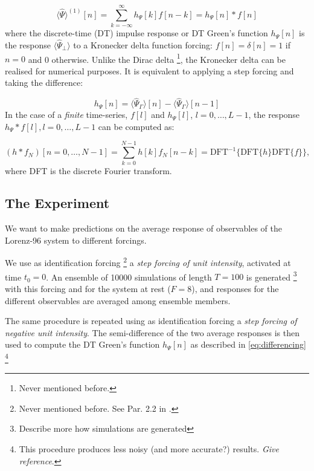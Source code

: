 \documentclass{article}
\begin{document}
\begin{equation}
\langle\hat{\Psi}\rangle^{(1)}[n]=\sum_{k=-\infty}^{\infty} h_{\Psi}[k] f[n-k]=h_{\Psi}[n] * f[n]
\end{equation}
where the discrete-time (DT) impulse response or DT Green's function $h_{\Psi}[n]$ is the response $\langle\hat{\Psi}_{\perp}\rangle$ to a Kronecker delta function forcing: $f[n]=\delta[n]=1$ if $n=0$ and 0 otherwise. Unlike the Dirac delta \footnote{Never mentioned before.\label{fn8}}, the Kronecker delta can be realised for numerical purposes. It is equivalent to applying a step forcing and taking the difference: 

\begin{equation} \label{eq:differencing}
h_{\Psi}[n]=\langle\hat{\Psi}_{\Gamma}\rangle[n]-\langle\hat{\Psi}_{\Gamma}\rangle[n-1]
\end{equation}
In the case of a \textit{finite} time-series, $f[l]$ and $h_{\Psi}[l]$, $l=0, \dots, L-1$, the response $h_{\Psi} * f[l], l=0, \dots, L-1$ can be computed as:

\begin{equation}
\left(h * f_{N}\right)[n=0, \ldots, N-1]=\sum_{k=0}^{N-1} h[k] f_{N}[n-k]=\mathrm{DFT}^{-1}\{\mathrm{DFT}\{h\} \mathrm{DFT}\{f\}\},
\end{equation}
where DFT is the discrete Fourier transform.

\subsection{The Experiment}

We want to make predictions on the average response of observables of the Lorenz-96 system to different forcings.

We use as identification forcing \footnote{Never mentioned before. See Par. 2.2 in \cite{Bodai}.\label{fn9}} a \textit{step forcing of unit intensity}, activated at time $t_0=0$. An ensemble of 10000 simulations of length $T=100$ is generated \footnote{Describe more how simulations are generated} with this forcing and for the system at rest ($F=8$), and responses for the different observables are averaged among ensemble members.

The same procedure is repeated using as identification forcing a \textit{step forcing of negative unit intensity}. The semi-difference of the two average responses is then used to compute the DT Green's function $h_{\Psi}[n]$ as described in \eqref{eq:differencing} \footnote{This procedure produces less noisy (and more accurate?) results. \textit{Give reference}.}
\end{document}
